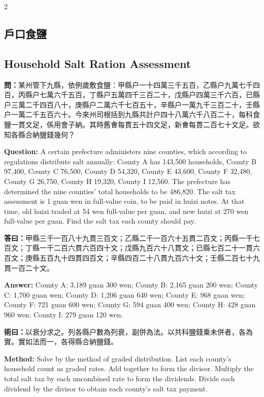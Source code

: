 \documentclass[11pt,a4paper]{article}
\newcommand{\QuestionText}[1]{\par\noindent\textbf{\color{problemcolor}問：}#1\par}
\newcommand{\AnswerText}[1]{\par\noindent\textbf{\color{answercolor}答曰：}#1\par}
\newcommand{\MethodText}[1]{\par\noindent\textbf{\color{methodcolor}術曰：}#1\par}
\newcommand{\QuestionEn}[1]{\par\noindent\textbf{\color{problemcolor}Question:} #1\par}
\newcommand{\AnswerEn}[1]{\par\noindent\textbf{\color{answercolor}Answer:} #1\par}
\newcommand{\MethodEn}[1]{\par\noindent\textbf{\color{methodcolor}Method:} #1\par}
\begin{document}
\begin{paracol}{2}

\subsection*{\color{sectioncolor}戶口食鹽}
\switchcolumn
\subsection*{\color{sectioncolor}Household Salt Ration Assessment}
\switchcolumn*

\QuestionText{某州管下九縣，依例歲敷食鹽：甲縣户一十四萬三千五百，乙縣户九萬七千四百，丙縣户七萬六千五百，丁縣户五萬四千三百二十，戊縣户四萬三千六百，已縣户三萬二千四百八十，庚縣户二萬六千七百五十，辛縣户一萬九千三百二十，壬縣户一萬二千五百六十。今來州司根括到九縣共計户四十八萬六千八百二十，每科食鹽一貫文足，係用會子納。其時舊㑹每貫五十四文足，新㑹每貫二百七十文足。欲知各縣合納鹽錢幾何？}
\switchcolumn
\QuestionEn{A certain prefecture administers nine counties, which according to regulations distribute salt annually: County A has 143,500 households, County B 97,400, County C 76,500, County D 54,320, County E 43,600, County F 32,480, County G 26,750, County H 19,320, County I 12,560. The prefecture has determined the nine counties' total households to be 486,820. The salt tax assessment is 1 guan wen in full-value coin, to be paid in huizi notes. At that time, old huizi traded at 54 wen full-value per guan, and new huizi at 270 wen full-value per guan. Find the salt tax each county should pay.}
\switchcolumn*

\AnswerText{甲縣三千一百八十九貫三百文；乙縣二千一百六十五貫二百文；丙縣一千七百文；丁縣一千二百六貫六百四十文；戊縣九百六十八貫文；已縣七百二十一貫六百文；庚縣五百九十四貫四百文；辛縣四百二十八貫九百六十文；壬縣二百七十九貫一百二十文。}
\switchcolumn
\AnswerEn{County A: 3,189 guan 300 wen; County B: 2,165 guan 200 wen; County C: 1,700 guan wen; County D: 1,206 guan 640 wen; County E: 968 guan wen; County F: 721 guan 600 wen; County G: 594 guan 400 wen; County H: 428 guan 960 wen; County I: 279 guan 120 wen.}
\switchcolumn*

\MethodText{以衰分求之。列各縣户數為列衰，副併為法。以共科鹽錢乗未併者，各為實。實如法而一，各得縣合納鹽錢。}
\switchcolumn
\MethodEn{Solve by the method of graded distribution. List each county's household count as graded rates. Add together to form the divisor. Multiply the total salt tax by each uncombined rate to form the dividends. Divide each dividend by the divisor to obtain each county's salt tax payment.}
\switchcolumn*


\end{paracol}
\end{document}
